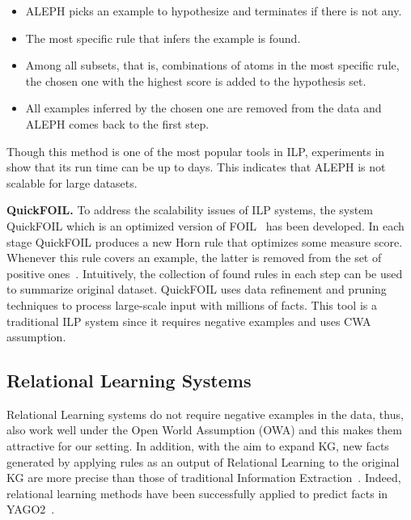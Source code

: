 \begin{itemize}
\item ALEPH picks an example to hypothesize and terminates if there is not any.
\item The most specific rule that infers the example is found.
\item Among all subsets, that is, combinations of atoms in the most specific rule, the chosen one with the highest score is added to the hypothesis set.
\item All examples inferred by the chosen one are removed from the data and ALEPH comes back to the first step.
\end{itemize}

Though this method is one of the most popular tools in ILP, experiments in~\cite{ref10} show that its run time can be up to days. This indicates that ALEPH is not scalable for large datasets.

\textbf{QuickFOIL.} To address the scalability issues of ILP systems, the system QuickFOIL which is an optimized version of FOIL~\cite{ref36} has been developed. In each stage QuickFOIL produces a new Horn rule that optimizes some measure score. Whenever this rule covers an example, the latter is removed from the set of positive ones~\cite{ref10}. Intuitively, the collection of found rules in each step can be used to summarize original dataset. QuickFOIL uses data refinement and pruning techniques to process large-scale input with millions of facts. This tool is a traditional ILP system since it requires negative examples and uses CWA assumption.

\subsection{Relational Learning Systems}

Relational Learning systems do not require negative examples in the data, thus, also work well under the Open World Assumption (OWA) and this makes them attractive for our setting. In addition, with the aim to expand KG, new facts generated by applying rules as an output of Relational Learning to the original KG are more precise than those of traditional Information Extraction~\cite{ref29}. Indeed, relational learning methods have been successfully applied to predict facts in YAGO2~\cite{ref30}.

